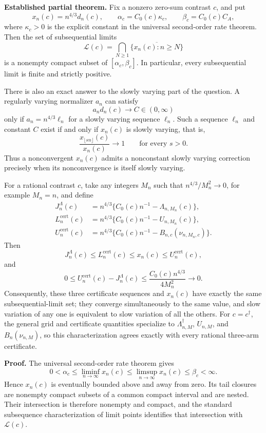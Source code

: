 \textbf{Established partial theorem.}
Fix a nonzero zero-sum contrast \(c\), and put
\[
 x_n(c)=n^{4/3}d_n(c),\qquad
 \alpha_c=C_0(c)\kappa_c,\qquad
 \beta_c=C_0(c)C_A,
\]
where \(\kappa_c>0\) is the explicit constant in the universal second-order rate theorem.  Then the set of subsequential limits
\[
 \mathcal L(c)=\bigcap_{N\geq1}
 \overline{\{x_n(c):n\geq N\}}
\]
is a nonempty compact subset of \([\alpha_c,\beta_c]\).  In particular, every subsequential limit is finite and strictly positive.

There is also an exact answer to the slowly varying part of the question.  A regularly varying normalizer \(a_n\) can satisfy
\[
 a_nd_n(c)\longrightarrow C\in(0,\infty)
\]
only if \(a_n=n^{4/3}\ell_n\) for a slowly varying sequence \(\ell_n\).  Such a sequence \(\ell_n\) and constant \(C\) exist if and only if \(x_n(c)\) is slowly varying, that is,
\[
 \frac{x_{\lfloor sn\rfloor}(c)}{x_n(c)}\longrightarrow1
 \qquad\text{for every }s>0.
\]
Thus a nonconvergent \(x_n(c)\) admits a nonconstant slowly varying correction precisely when its nonconvergence is itself slowly varying.

For a rational contrast \(c\), take any integers \(M_n\) such that \(n^{4/3}/M_n^2\to0\), for example \(M_n=n\), and define
\[
 \begin{aligned}
 J_n^{\Lambda}(c)
 &=n^{4/3}\{C_0(c)n^{-1}-\Lambda_{n,M_n}(c)\},\\
 L_n^{\mathrm{cert}}(c)
 &=n^{4/3}\{C_0(c)n^{-1}-U_{n,M_n}(c)\},\\
 U_n^{\mathrm{cert}}(c)
 &=n^{4/3}\{C_0(c)n^{-1}-B_{n,c}(\nu_{n,M_n,c})\}.
 \end{aligned}
\]
Then
\[
 J_n^{\Lambda}(c)\leq L_n^{\mathrm{cert}}(c)
 \leq x_n(c)\leq U_n^{\mathrm{cert}}(c),
\]
and
\[
 0\leq U_n^{\mathrm{cert}}(c)-J_n^{\Lambda}(c)
 \leq \frac{C_0(c)n^{4/3}}{4M_n^2}\longrightarrow0.
\]
Consequently, these three certificate sequences and \(x_n(c)\) have exactly the same subsequential-limit set; they converge simultaneously to the same value, and slow variation of any one is equivalent to slow variation of all the others.  For \(c=c^\dagger\), the general grid and certificate quantities specialize to \(\Lambda_{n,M}^\dagger\), \(U_{n,M}\), and \(B_n(\nu_{n,M})\), so this characterization agrees exactly with every rational three-arm certificate.

\textbf{Proof.}
The universal second-order rate theorem gives
\[
 0<\alpha_c\leq\liminf_{n\to\infty}x_n(c)
 \leq\limsup_{n\to\infty}x_n(c)\leq\beta_c<\infty.
\]
Hence \(x_n(c)\) is eventually bounded above and away from zero.  Its tail closures are nonempty compact subsets of a common compact interval and are nested.  Their intersection is therefore nonempty and compact, and the standard subsequence characterization of limit points identifies that intersection with \(\mathcal L(c)\).


